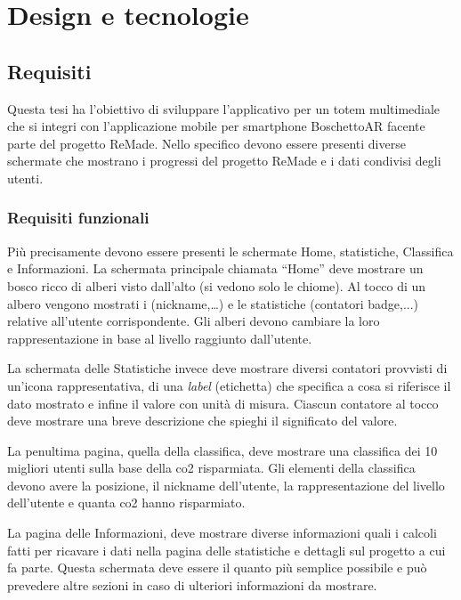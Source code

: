 \chapter{Design e tecnologie}
\section{Requisiti}
Questa tesi ha l'obiettivo di sviluppare l'applicativo per un totem multimediale che si integri con l'applicazione mobile per smartphone BoschettoAR facente parte del progetto ReMade.
Nello specifico devono essere presenti diverse schermate che mostrano i progressi del progetto ReMade e i dati condivisi degli utenti.
%
\subsection{Requisiti funzionali}
Più precisamente devono essere presenti le schermate Home, statistiche, Classifica e Informazioni.
La schermata principale chiamata \enquote{Home} deve mostrare un bosco ricco di alberi visto dall'alto (si vedono solo le chiome). Al tocco di un albero vengono mostrati i  (nickname,\dots) e le statistiche (contatori badge,...) relative all'utente corrispondente. Gli alberi devono cambiare la loro rappresentazione in base al livello raggiunto dall'utente.

La schermata delle Statistiche invece deve mostrare diversi contatori provvisti di un'icona rappresentativa, di una \textit{label} (etichetta) che specifica a cosa si riferisce il dato mostrato e infine il valore con unità di misura. Ciascun contatore al tocco deve mostrare una breve descrizione che spieghi il significato del valore.

La penultima pagina, quella della classifica, deve mostrare una classifica dei 10 migliori utenti sulla base della co2 risparmiata.
Gli elementi della classifica devono avere la posizione, il nickname dell'utente, la rappresentazione del livello dell'utente e quanta co2 hanno risparmiato.

La pagina delle Informazioni, deve mostrare diverse informazioni quali i calcoli fatti per ricavare i dati nella pagina delle statistiche e dettagli sul progetto a cui fa parte. Questa schermata deve essere il quanto più semplice possibile e può prevedere altre sezioni in caso di ulteriori informazioni da mostrare.

